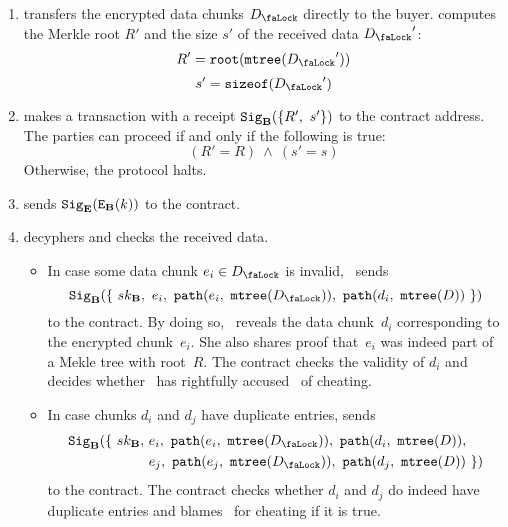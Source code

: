 \begin{enumerate}
\item {} transfers the encrypted data chunks $\Lock{D}$ directly to the buyer.  computes the Merkle root $R'$ and the size $s'$ of the received data $\Lock{D}'$:
\begin{equation}
R' = \Root(\MerkleTree(\Lock{D}'))
\end{equation}
\begin{equation}
s' = \SizeOf(\Lock{D}')
\end{equation}
\item \label{step:buyers-receipt}  makes a transaction with a receipt $\mathtt{Sig}_{\mathbf{B}}(\{R',\ s'\})$ to the contract address. The parties can proceed if and only if the following is true:
\begin{equation}
(R' = R)\ \land\ (s' = s)
\end{equation}
Otherwise, the protocol halts.
\item \label{step:secret-sharing}  sends $\mathtt{Sig}_{\mathbf{E}}(\mathtt{E}_{\mathbf{B}}(k))$ to the contract.
\item \label{step:arbitrage}  decyphers and checks the received data.

  \begin{itemize}
    \item In case some data chunk $e_i \in \Lock{D}$ is invalid, ~sends
    \begin{equation*}
      \Sign_\Party{B}(\{\ \SecretKey{B},\ e_i,\ \Path(e_i,\ \MerkleTree(\Lock{D})),\ \Path(d_i,\ \MerkleTree(D))\ \})
    \end{equation*}
    to the contract. By doing so, ~reveals the data chunk~$d_i$ corresponding to the encrypted chunk~$e_i$. She also shares proof that~$e_i$ was indeed part of a  Mekle tree with root~$R$. The contract checks the validity of $d_i$ and decides whether ~has rightfully accused~ of cheating.

    \item In case chunks $d_i$ and $d_j$ have duplicate entries,  sends
    \begin{equation*}
      \begin{split}
        \Sign_\Party{B}(\{\ \SecretKey{B}, & \ e_i,\ \Path(e_i,\ \MerkleTree(\Lock{D})),\ \Path(d_i,\ \MerkleTree(D)),\\
         & \ e_j,\ \Path(e_j,\ \MerkleTree(\Lock{D})),\ \Path(d_j,\ \MerkleTree(D))\ \})
      \end{split}
    \end{equation*}
    to the contract. The contract checks whether $d_i$ and $d_j$ do indeed have duplicate entries and blames~ for cheating if it is true.
  \end{itemize}
\end{enumerate}

